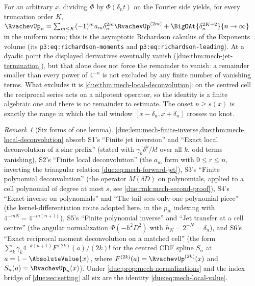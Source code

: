\documentclass[11pt,oneside]{article}
\theoremstyle{plain}
\theoremstyle{definition}
\theoremstyle{remark}
\newtheorem{remark}[theorem]{Remark}
\newcommand{\upn}[1]{\RvachevUp_{#1}}
\newcommand{\PhiUp}{\Phi}                                   %
\newcommand{\dep}[1]{s\!\left(#1\right)}                    %
\newcommand{\am}[1]{a_{#1}}                                 %
\begin{document}
\begin{warningbox}[title={An all-orders asymptotic expansion is not an identity}]
For an arbitrary \(x\), dividing \(\PhiUp\) by \(\PhiUp(\delta_nt)\) on the
Fourier side yields, for every truncation order \(K\),
\(\upn{n}=\sum_{m\le K}(-1)^m\am{m}\delta_n^{2m}\RvachevUp^{(2m)}+\BigOAt{\delta_n^{2K+2}}{n\to\infty}\)
in the uniform norm; this is the asymptotic Richardson calculus of the
Exponents volume \cite{proveit-exponents} (its \texttt{p3:eq:richardson-\allowbreak moments}
and \texttt{p3:eq:richardson-\allowbreak leading}).  At a dyadic point the displayed
derivatives eventually vanish (\cref{due:thm:mech-jet-termination}), but that
alone does not force the remainder to vanish: a remainder smaller than every
power of \(4^{-n}\) is not excluded by any finite number of vanishing terms.
What excludes it is \cref{due:thm:mech-local-deconvolution}: on the centred
cell the reciprocal series acts on a nilpotent operator, so the identity is a
finite algebraic one and there is no remainder to estimate.  The onset
\(n\ge\dep{x}\) is exactly the range in which the tail window
\([x-\delta_n,x+\delta_n]\) crosses no knot.
\end{warningbox}

\begin{remark}[Six forms of one lemma]
\label{due:rmk:mech-six-forms}
\cref{due:lem:mech-finite-inverse,due:thm:mech-local-deconvolution} absorb
S1's ``Finite jet inversion'' and ``Exact local deconvolution of a sinc
prefix'' (stated with \(\gamma_k\delta^{k}/k!\) over all \(k\), odd terms
vanishing), S2's ``Finite local deconvolution'' (the \(a_m\) form with
\(0\le r\le n\), inverting the triangular relation
\cref{due:eq:mech-forward-jet}), S3's ``Finite polynomial deconvolution''
(the operator \(M(\delta D)\) on polynomials, applied to a cell polynomial of
degree at most \(s\), see \cref{due:rmk:mech-second-proof}), S4's ``Exact
inverse on polynomials'' and ``The tail sees only one polynomial piece'' (the
kernel-differentiation route adopted here, in the \(p_N\) indexing with
\(4^{-mN}=4^{-m(n+1)}\)), S5's ``Finite polynomial inverse'' and ``Jet
transfer at a cell centre'' (the angular normalization
\(\Phi(-h^{2}D^{2})\) with \(h_N=2^{-N}=\delta_n\)), and S6's ``Exact
reciprocal moment deconvolution on a matched cell'' (the form
\(\sum_k\gamma_k4^{-k(n+1)}F^{(2k)}(a)/(2k)!\) for the centred CDF spline
\(S_n\) at \(a=1-\AbsoluteValue{x}\), where \(F^{(2k)}(a)=\RvachevUp^{(2k)}(x)\)
and \(S_n(a)=\upn{n}(x)\)).  Under \cref{due:prop:mech-normalizations} and the
index bridge of \cref{due:sec:setting} all six are the identity
\cref{due:eq:mech-local-value}.
\end{remark}
\end{document}
